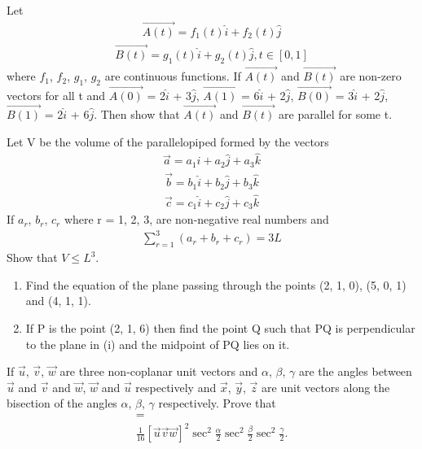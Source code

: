 \item Let 
\begin{align*}
\overrightarrow{A(t)} = f_1(t)\hat{i} + f_2(t)\hat{j}
\end{align*}
\begin{align*}
\overrightarrow{B(t)} = g_1(t)\hat{i} + g_2(t)\hat{j}, t \in [0,1]
\end{align*}
where $f_1$, $f_2$, $g_1$, $g_2$ are continuous functions. If $\overrightarrow{A(t)}$ and $\overrightarrow{B(t)}$ are non-zero vectors for all t and $\overrightarrow{A(0)}$ = 2$\hat{i}$ + 3$\hat{j}$, $\overrightarrow{A(1)}$ = 6$\hat{i}$ + 2$\hat{j}$, $\overrightarrow{B(0)}$ = 3$\hat{i}$ + 2$\hat{j}$, 
$\overrightarrow{B(1)}$ = 2$\hat{i}$ + 6$\hat{j}$. Then show that $\overrightarrow{A(t)}$ and $\overrightarrow{B(t)}$ are parallel for some t.

\item Let V be the volume of the parallelopiped formed by the vectors
\begin{align*}
\overrightarrow{a} = a_1\hat{i} + a_2\hat{j} + a_3\hat{k}
\end{align*}
\begin{align*}
\overrightarrow{b} = b_1\hat{i} + b_2\hat{j} + b_3\hat{k}
\end{align*}
\begin{align*}
\overrightarrow{c} = c_1\hat{i} + c_2\hat{j} + c_3\hat{k}
\end{align*}
If $a_r$, $b_r$, $c_r$ where r = 1, 2, 3, are non-negative real numbers and 
\begin{align*}
\sum_{r=1}^{3}(a_r + b_r + c_r)=3L
\end{align*}
Show that $V \leq L^{3}$.

\item 
\begin{enumerate}
\item Find the equation of the plane passing through the points (2, 1, 0), (5, 0, 1) and (4, 1, 1).
\item If P is the point (2, 1, 6) then find the point Q such that PQ is perpendicular to the plane in (i) and the midpoint of PQ lies on it.
\end{enumerate}

\item If $\overrightarrow{u}$, $\overrightarrow{v}$, $\overrightarrow{w}$ are three non-coplanar unit vectors and $\alpha$, $\beta$, $\gamma$ are the angles between $\overrightarrow{u}$ and $\overrightarrow{v}$ and $\overrightarrow{w}$, $\overrightarrow{w}$ and $\overrightarrow{u}$ respectively and $\overrightarrow{x}$, $\overrightarrow{y}$, $\overrightarrow{z}$ are unit vectors along the bisection of the angles $\alpha$, $\beta$, $\gamma$ respectively. Prove that
\begin{align*}
[(\overrightarrow{x} \times \overrightarrow{y})  (\overrightarrow{y} \times \overrightarrow{z}) (\overrightarrow{z} \times \overrightarrow{x})] =\\
\frac{1}{16}[\overrightarrow{u}\overrightarrow{v}\overrightarrow{w}]^{2} \sec^{2}\frac{\alpha}{2}\sec^{2}\frac{\beta}{2}\sec^{2}\frac{\gamma}{2}.
\end{align*}

